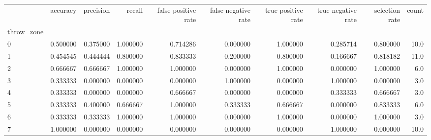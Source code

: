 \begin{tabular}{lrrrrrrrrr}
\toprule
{} &  accuracy &  precision &    recall &  false positive rate &  false negative rate &  true positive rate &  true negative rate &  selection rate &  count \\
throw\_zone &           &            &           &                      &                      &                     &                     &                 &        \\
\midrule
0          &  0.500000 &   0.375000 &  1.000000 &             0.714286 &             0.000000 &            1.000000 &            0.285714 &        0.800000 &   10.0 \\
1          &  0.454545 &   0.444444 &  0.800000 &             0.833333 &             0.200000 &            0.800000 &            0.166667 &        0.818182 &   11.0 \\
2          &  0.666667 &   0.666667 &  1.000000 &             1.000000 &             0.000000 &            1.000000 &            0.000000 &        1.000000 &    6.0 \\
3          &  0.333333 &   0.000000 &  0.000000 &             0.000000 &             1.000000 &            0.000000 &            1.000000 &        0.000000 &    3.0 \\
4          &  0.333333 &   0.000000 &  0.000000 &             0.666667 &             0.000000 &            0.000000 &            0.333333 &        0.666667 &    3.0 \\
5          &  0.333333 &   0.400000 &  0.666667 &             1.000000 &             0.333333 &            0.666667 &            0.000000 &        0.833333 &    6.0 \\
6          &  0.333333 &   0.333333 &  1.000000 &             1.000000 &             0.000000 &            1.000000 &            0.000000 &        1.000000 &    3.0 \\
7          &  1.000000 &   0.000000 &  0.000000 &             0.000000 &             0.000000 &            0.000000 &            1.000000 &        0.000000 &   10.0 \\
\bottomrule
\end{tabular}
